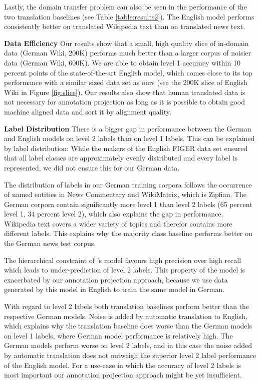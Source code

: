 \documentclass[11pt,a4paper]{article}
\begin{document}
Lastly, the domain transfer problem can also be seen in the performance of the two translation baselines (see Table \ref{table:results2}). The English model performs consistently better on translated Wikipedia text than on translated news text.

\textbf{Data Efficiency} Our results show that a small, high quality slice of in-domain data (German Wiki, 200K) performs much better than a larger corpus of noisier data (German Wiki, 600K). We are able to obtain level 1 accuracy within 10 percent points of the state-of-the-art English model, which comes close to its top performance with a similar sized data set as ours (see the 200K slice of English Wiki in Figure \ref{fig:slice}). Our results also show that human translated data is not necessary for annotation projection as long as it is possible to obtain good machine aligned data and sort it by alignment quality. 

\textbf{Label Distribution} There is a bigger gap in performance between the German and English models on level 2 labels than on level 1 labels. This can be explained by label distribution: While the makers of the English FIGER data set ensured that all label classes are approximately evenly distributed and every label is represented, we did not ensure this for our German data. 

The distribution of labels in our German training corpora follows the occurrence of named entities in News Commentary and WikiMatrix, which is Zipfian. The German corpora contain significantly more level 1 than level 2 labels (65 percent level 1, 34 percent level 2), which also explains the gap in performance. Wikipedia text covers a wider variety of topics and therefor contains more different labels. This explains why the majority class baseline performs better on the German news test corpus.

The hierarchical constraint of \citet{ChenCD20}'s model favours high precision over high recall which leads to under-prediction of level 2 labels. This property of the model is exacerbated by our annotation projection approach, because we use data generated by this model in English to train the same model in German. 

With regard to level 2 labels both translation baselines perform better than the respective German models. Noise is added by automatic translation to English, which explains why the translation baseline does worse than the German models on level 1 labels, where German model performance is relatively high. The German models perform worse on level 2 labels, and in this case the noise added by automatic translation does not outweigh the superior level 2 label performance of the English model. For a use-case in which the accuracy of level 2 labels is most important our annotation projection approach might be yet insufficient. 
\end{document}
